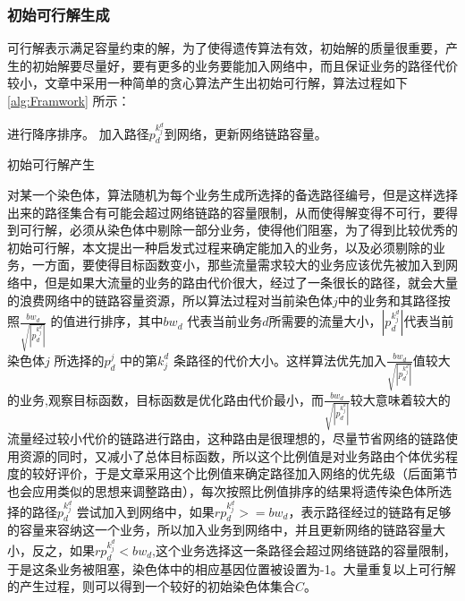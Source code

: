 \subsubsection{初始可行解生成}
可行解表示满足容量约束的解，为了使得遗传算法有效，初始解的质量很重要，产生的初始解要尽量好，要有更多的业务要能加入网络中，而且保证业务的路径代价较小，文章中采用一种简单的贪心算法产生出初始可行解，算法过程如下 \ref{alg:Framwork} 所示：
\begin{algorithm}[htb]
\begin{algorithmic}[1]
\EndFor
\EndFor
{}
\EndFor
{}进行降序排序。
\State 加入路径$p^{k^d_j}_d$到网络，更新网络链路容量。
\Else
{}
\EndIf
\EndFor
\EndFor
\end{algorithmic}
\caption{初始可行解产生}
\label{alg:Framwork}
\end{algorithm}

对某一个染色体，算法随机为每个业务生成所选择的备选路径编号，但是这样选择出来的路径集合有可能会超过网络链路的容量限制，从而使得解变得不可行，要得到可行解，必须从染色体中剔除一部分业务，使得他们阻塞，为了得到比较优秀的初始可行解，本文提出一种启发式过程来确定能加入的业务，以及必须剔除的业务，一方面，要使得目标函数变小，那些流量需求较大的业务应该优先被加入到网络中，但是如果大流量的业务的路由代价很大，经过了一条很长的路径，就会大量的浪费网络中的链路容量资源，所以算法过程对当前染色体$j$中的业务和其路径按照$\frac{bw_d}{\sqrt{|p^{k^d_j}_d|}}$ 的值进行排序，其中${bw_d}$ 代表当前业务$d$所需要的流量大小，$|p^{k^d_j}_d|$代表当前染色体$j$ 所选择的$p^j_d$ 中的第${k^d_j}$ 条路径的代价大小。这样算法优先加入$\frac{bw_d}{\sqrt{|p^{k^d_j}_d|}}$值较大的业务,观察目标函数，目标函数是优化路由代价最小，而$\frac{bw_d}{\sqrt{|p^{k^d_j}_d|}}$较大意味着较大的流量经过较小代价的链路进行路由，这种路由是很理想的，尽量节省网络的链路使用资源的同时，又减小了总体目标函数，所以这个比例值是对业务路由个体优劣程度的较好评价，于是文章采用这个比例值来确定路径加入网络的优先级（后面第节也会应用类似的思想来调整路由），每次按照比例值排序的结果将遗传染色体所选择的路径$p^{k^d_j}_d$ 尝试加入到网络中，如果$rp^{k^d_j}_d>=bw_d$，表示路径经过的链路有足够的容量来容纳这一个业务，所以加入业务到网络中，并且更新网络的链路容量大小，反之，如果$rp^{k^d_j}_d<bw_d$,这个业务选择这一条路径会超过网络链路的容量限制，于是这条业务被阻塞，染色体中的相应基因位置被设置为-1。大量重复以上可行解的产生过程，则可以得到一个较好的初始染色体集合$C$。

